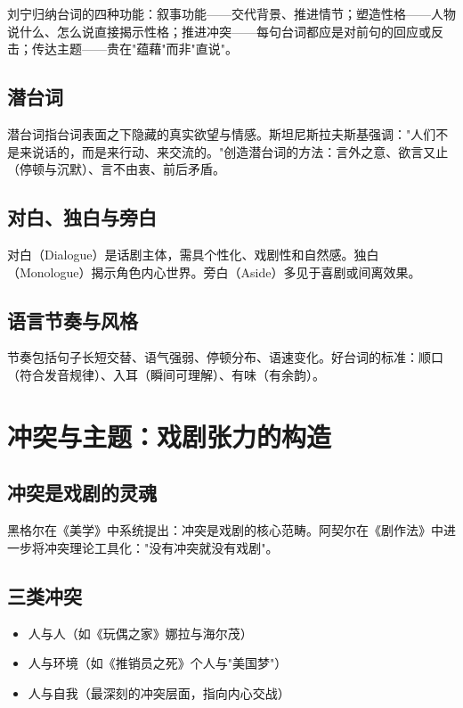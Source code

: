 刘宁归纳台词的四种功能\cite{liu:speech}：叙事功能——交代背景、推进情节；塑造性格——人物说什么、怎么说直接揭示性格；推进冲突——每句台词都应是对前句的回应或反击；传达主题——贵在"蕴藉"而非"直说"。

\subsection{潜台词}

潜台词指台词表面之下隐藏的真实欲望与情感。斯坦尼斯拉夫斯基强调："人们不是来说话的，而是来行动、来交流的。"\cite{stanislavski:system}创造潜台词的方法：言外之意、欲言又止（停顿与沉默）、言不由衷、前后矛盾。

\subsection{对白、独白与旁白}

对白（Dialogue）是话剧主体，需具个性化、戏剧性和自然感。独白（Monologue）揭示角色内心世界。旁白（Aside）多见于喜剧或间离效果。

\subsection{语言节奏与风格}

节奏包括句子长短交替、语气强弱、停顿分布、语速变化。好台词的标准：顺口（符合发音规律）、入耳（瞬间可理解）、有味（有余韵）。

\section{冲突与主题：戏剧张力的构造}

\subsection{冲突是戏剧的灵魂}

黑格尔在《美学》中系统提出：冲突是戏剧的核心范畴\cite{hegel:aesthetics}。阿契尔在《剧作法》中进一步将冲突理论工具化："没有冲突就没有戏剧"\cite{archer:playmaking}。

\subsection{三类冲突}

\begin{itemize}
  \item 人与人（如《玩偶之家》娜拉与海尔茂）
  \item 人与环境（如《推销员之死》个人与"美国梦"）
  \item 人与自我（最深刻的冲突层面，指向内心交战）
\end{itemize}

